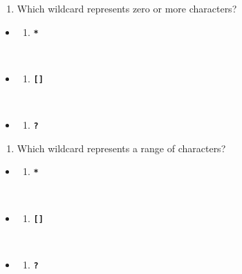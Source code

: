 \documentclass[
  letterpaper,
  DIV=11,
  numbers=noendperiod]{scrreprt}
\providecommand{\tightlist}{%
  \setlength{\itemsep}{0pt}\setlength{\parskip}{0pt}}\usepackage{longtable,booktabs,array}
\begin{document}
\begin{enumerate}
\def\labelenumi{\arabic{enumi}.}
\setcounter{enumi}{4}
\tightlist
\item
  Which wildcard represents zero or more characters?
\end{enumerate}

\begin{itemize}
\item
  \begin{enumerate}
  \def\labelenumi{(\Alph{enumi})}
  \tightlist
  \item
    \textbf{\texttt{*}}\strut \\
  \end{enumerate}
\item
  \begin{enumerate}
  \def\labelenumi{(\Alph{enumi})}
  \setcounter{enumi}{1}
  \tightlist
  \item
    \textbf{\texttt{{[}{]}}}\strut \\
  \end{enumerate}
\item
  \begin{enumerate}
  \def\labelenumi{(\Alph{enumi})}
  \setcounter{enumi}{2}
  \tightlist
  \item
    \textbf{\texttt{?}}
  \end{enumerate}
\end{itemize}

\begin{enumerate}
\def\labelenumi{\arabic{enumi}.}
\setcounter{enumi}{5}
\tightlist
\item
  Which wildcard represents a range of characters?
\end{enumerate}

\begin{itemize}
\item
  \begin{enumerate}
  \def\labelenumi{(\Alph{enumi})}
  \tightlist
  \item
    \textbf{\texttt{*}}\strut \\
  \end{enumerate}
\item
  \begin{enumerate}
  \def\labelenumi{(\Alph{enumi})}
  \setcounter{enumi}{1}
  \tightlist
  \item
    \textbf{\texttt{{[}{]}}}\strut \\
  \end{enumerate}
\item
  \begin{enumerate}
  \def\labelenumi{(\Alph{enumi})}
  \setcounter{enumi}{2}
  \tightlist
  \item
    \textbf{\texttt{?}}
  \end{enumerate}
\end{itemize}
\end{document}
